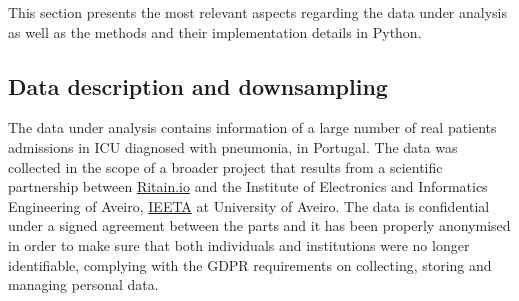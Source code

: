 \documentclass[journal]{IEEEtran} %
\begin{document}
This section presents the most relevant aspects regarding the data under analysis as well as the methods and their implementation details in Python.

\subsection{Data description and downsampling}
The data under analysis contains information of a large number of real patients admissions in ICU diagnosed with pneumonia, in Portugal.
The data was collected in the scope of a broader project that results from a scientific partnership between \hyperlink{https://ritain.io}{Ritain.io} and the Institute of Electronics and Informatics Engineering of Aveiro, \hyperlink{http://www.ieeta.pt/}{IEETA} at University of Aveiro. The data is confidential under a signed agreement between the parts and it has been properly anonymised in order to make sure that both individuals and institutions were no longer identifiable, complying with the GDPR requirements on collecting, storing and managing personal data.
\end{document}
